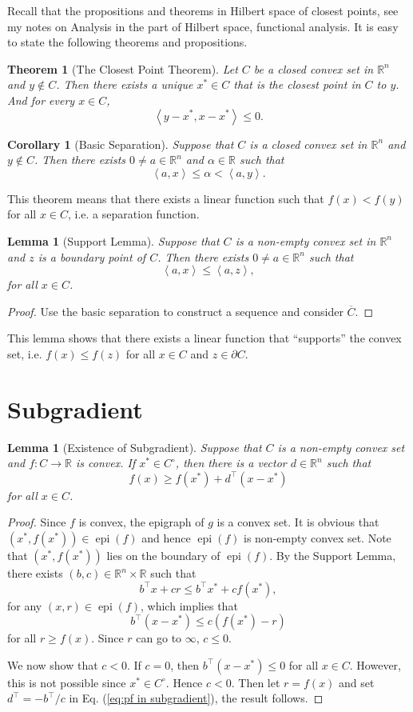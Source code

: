 \documentclass[12pt,a4paper]{report}
\numberwithin{equation}{section}
\theoremstyle{mystyle}
\newtheorem{theorem}[definition]{Theorem}
\newtheorem{lemma}[definition]{Lemma}
\newtheorem{corollary}[definition]{Corollary}
\newcommand{\R}{\mathbb{R}}
\newcommand{\T}{\top}
\newcommand{\epi}{\operatorname{epi}}
\newcommand{\inner}[1]{\left\langle #1 \right\rangle}
\begin{document}
	Recall that the propositions and theorems in Hilbert space of closest points, see my notes on Analysis in the part of Hilbert space, functional analysis. It is easy to state the following theorems and propositions.
	\begin{theorem}[The Closest Point Theorem]
		Let $C$ be a closed convex set in $\R^n$ and $y\notin C$. Then there exists a unique $x^*\in C$ that is the closest point in $C$ to $y$. And for every $x\in C$,
		$$
		\inner{y-x^*,x-x^*}\leq 0.
		$$
	\end{theorem}
	\begin{corollary}[Basic Separation]
		Suppose that $C$ is a closed convex set in $\R^n$ and $y\notin C$. Then there exists $0\neq a\in \R^n$ and $\alpha\in \R$ such that
		$$
		\inner{a,x}\leq \alpha <\inner{a,y}.
		$$
	\end{corollary}
	This theorem means that there exists a linear function such that $f(x)<f(y)$ for all $x\in C$, i.e. a separation function.
	
	\begin{lemma}[Support Lemma]
		Suppose that $C$ is a non-empty convex set in $\R^n$ and $z$ is a boundary point of $C$. Then there exists $0\neq a\in \R^n$ such that 
		$$
		\inner{a,x}\leq \inner{a,z},
		$$
		for all $x\in C$.
	\end{lemma}
	\begin{proof}
		Use the basic separation to construct a sequence and consider $\overline{C}$.
	\end{proof}
	This lemma shows that there exists a linear function that ``supports'' the convex set, i.e. $f(x)\leq f(z)$ for all $x\in C$ and $z\in \partial C$.
	
	
	\section{Subgradient}
	\begin{lemma}[Existence of Subgradient]\label{lem:Existence of Subgradient}
		Suppose that $C$ is a non-empty convex set and $f:C\to \R$ is convex. If $x^*\in C^\circ$, then there is a vector $d\in \R^n$ such that
		$$
		f(x)\geq f(x^*)+d^\T (x-x^*)
		$$
		for all $x\in C$.
	\end{lemma}
	\begin{proof}
		Since $f$ is convex, the epigraph of $g$ is a convex set. It is obvious that $(x^*,f(x^*))\in \epi(f)$ and hence $\epi(f)$ is non-empty convex set. Note that $(x^*,f(x^*))$ lies on the boundary of $\epi(f)$. By the Support Lemma, there exists $(b,c)\in \R^n \times \R$ such that
		$$
		b^\T x+cr\leq b^\T x^* + cf(x^*),
		$$
		for any $(x,r)\in \epi(f)$, which implies that
		\begin{equation}\label{eq:pf in subgradient}
			b^\T (x-x^*)\leq c(f(x^*)-r)
		\end{equation}
		for all $r\geq f(x)$. Since $r$ can go to $\infty$, $c\leq 0$.
		
		We now show that $c<0$. If $c=0$, then $b^\T (x-x^*)\leq 0$ for all $x\in C$. However, this is not possible since $x^*\in C^\circ$. Hence $c<0$. Then let $r=f(x)$ and set $d^\T=-b^\T/c$ in Eq. (\ref{eq:pf in subgradient}), the result follows.
	\end{proof}
	
\end{document}
